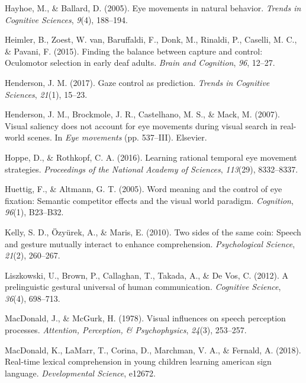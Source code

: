 \documentclass[,man,floatsintext]{apa6}
\begin{document}
\leavevmode\hypertarget{ref-hayhoe2005eye}{}%
Hayhoe, M., \& Ballard, D. (2005). Eye movements in natural behavior. \emph{Trends in Cognitive Sciences}, \emph{9}(4), 188--194.

\leavevmode\hypertarget{ref-heimler2015finding}{}%
Heimler, B., Zoest, W. van, Baruffaldi, F., Donk, M., Rinaldi, P., Caselli, M. C., \& Pavani, F. (2015). Finding the balance between capture and control: Oculomotor selection in early deaf adults. \emph{Brain and Cognition}, \emph{96}, 12--27.

\leavevmode\hypertarget{ref-henderson2017gaze}{}%
Henderson, J. M. (2017). Gaze control as prediction. \emph{Trends in Cognitive Sciences}, \emph{21}(1), 15--23.

\leavevmode\hypertarget{ref-henderson2007visual}{}%
Henderson, J. M., Brockmole, J. R., Castelhano, M. S., \& Mack, M. (2007). Visual saliency does not account for eye movements during visual search in real-world scenes. In \emph{Eye movements} (pp. 537--III). Elsevier.

\leavevmode\hypertarget{ref-hoppe2016learning}{}%
Hoppe, D., \& Rothkopf, C. A. (2016). Learning rational temporal eye movement strategies. \emph{Proceedings of the National Academy of Sciences}, \emph{113}(29), 8332--8337.

\leavevmode\hypertarget{ref-huettig2005word}{}%
Huettig, F., \& Altmann, G. T. (2005). Word meaning and the control of eye fixation: Semantic competitor effects and the visual world paradigm. \emph{Cognition}, \emph{96}(1), B23--B32.

\leavevmode\hypertarget{ref-kelly2010two}{}%
Kelly, S. D., Özyürek, A., \& Maris, E. (2010). Two sides of the same coin: Speech and gesture mutually interact to enhance comprehension. \emph{Psychological Science}, \emph{21}(2), 260--267.

\leavevmode\hypertarget{ref-liszkowski2012prelinguistic}{}%
Liszkowski, U., Brown, P., Callaghan, T., Takada, A., \& De Vos, C. (2012). A prelinguistic gestural universal of human communication. \emph{Cognitive Science}, \emph{36}(4), 698--713.

\leavevmode\hypertarget{ref-macdonald1978visual}{}%
MacDonald, J., \& McGurk, H. (1978). Visual influences on speech perception processes. \emph{Attention, Perception, \& Psychophysics}, \emph{24}(3), 253--257.

\leavevmode\hypertarget{ref-macdonald2018real}{}%
MacDonald, K., LaMarr, T., Corina, D., Marchman, V. A., \& Fernald, A. (2018). Real-time lexical comprehension in young children learning american sign language. \emph{Developmental Science}, e12672.
\end{document}
